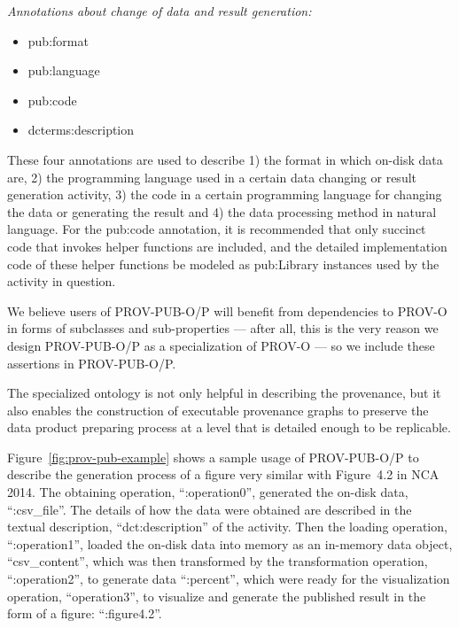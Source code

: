 \noindent\emph{Annotations about change of data and result generation:}
\begin{itemize}
	\item pub:format
	\item pub:language%
	\item pub:code%
	\item dcterms:description%
\end{itemize}
These four annotations are used to describe 1) the format in which on-disk data are, 2) the programming language used in a certain data changing or result generation activity, 3) the code in a certain programming language for changing the data or generating the result and 4) the data processing method in natural language. For the pub:code annotation, it is recommended that only succinct code that invokes helper functions are included, and the detailed implementation code of these helper functions be modeled as pub:Library instances used by the activity in question.

We believe users of PROV-PUB-O/P will benefit from dependencies to PROV-O in forms of subclasses and sub-properties --- after all, this is the very reason we design PROV-PUB-O/P as a specialization of PROV-O --- so we include these assertions in PROV-PUB-O/P.

The specialized ontology is not only helpful in describing the provenance, but it also enables the construction of executable provenance graphs to preserve the data product preparing process at a level that is detailed enough to be replicable.

Figure~\ref{fig:prov-pub-example} shows a sample usage of PROV-PUB-O/P to describe the generation process of a figure very similar with Figure~4.2 in NCA 2014. The obtaining operation, ``:operation0'', generated the on-disk data, ``:csv\_file''. The details of how the data were obtained are described in the textual description, ``dct:description'' of the activity. Then the loading operation, ``:operation1'', loaded the on-disk data into memory as an in-memory data object, ``csv\_content'', which was then transformed by the transformation operation, ``:operation2'', to generate data ``:percent'', which were ready for the visualization operation, ``operation3'', to visualize and generate the published result in the form of a figure: ``:figure4.2''. 

